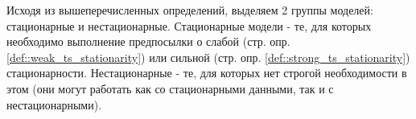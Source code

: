 		Исходя из вышеперечисленных определений, выделяем 2 группы моделей: стационарные и нестационарные. Стационарные модели - те, для которых необходимо выполнение предпосылки о слабой (стр. \pageref{def::weak_ts_stationarity} опр. \ref{def::weak_ts_stationarity}) или сильной (стр. \pageref{def::strong_ts_stationarity} опр. \ref{def::strong_ts_stationarity}) стационарности. Нестационарные - те, для которых нет строгой необходимости в этом (они могут работать как со стационарными данными, так и с нестационарными).		
		
		
		
		
		
		
		
		
		
		